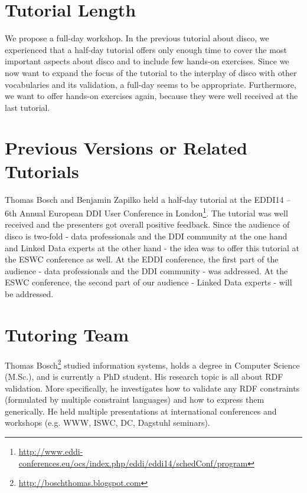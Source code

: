 \documentclass{llncs}
\begin{document}
\section{Tutorial Length}

We propose a full-day workshop. In the previous tutorial about disco, we experienced that a half-day tutorial offers only enough time to cover the most important aspects about disco and to include few hands-on exercises. Since we now want to expand the focus of the tutorial to the interplay of disco with other vocabularies and its validation, a full-day seems to be appropriate. Furthermore, we want to offer hands-on exercises again, because they were well received at the last tutorial.

\section{Previous Versions or Related Tutorials}

Thomas Bosch and Benjamin Zapilko held a half-day tutorial at the EDDI14 – 6th Annual European DDI User Conference in London\footnote{\url{http://www.eddi-conferences.eu/ocs/index.php/eddi/eddi14/schedConf/program}}.
The tutorial was well received and the presenters got overall positive feedback. Since the audience of disco is two-fold - data professionals and the DDI community at the one hand and Linked Data experts at the other hand - the idea was to offer this tutorial at the ESWC conference as well.
At the EDDI conference, the first part of the audience - data professionals and the DDI community - was addressed.
At the ESWC conference, the second part of our audience - Linked Data experts - will be addressed.

\section{Tutoring Team}


Thomas Bosch\footnote{\url{http://boschthomas.blogspot.com}} studied information systems, holds a degree in Computer Science (M.Sc.), and is currently a PhD student.
His research topic is all about RDF validation.
More specifically, he investigates how to validate any RDF constraints (formulated by multiple constraint languages) and how to express them generically. 
He held multiple presentations at international conferences and workshops (e.g. WWW, ISWC, DC, Dagstuhl seminars). 
\end{document}
